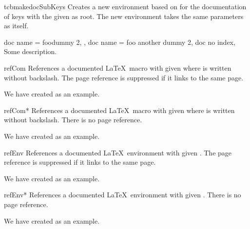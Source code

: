 \begin{docCommand}[doc new=2020-04-22]{tcbmakedocSubKeys}{}
  Creates a new environment  based on  for the
  documentation of keys with the given  as root.
  The new environment  takes the same para\-meters as  itself.
\begin{dispExample}

\begin{docFooKeys}[
    doc parameter   = {=\meta{nothing}},
    doc description = {no default, initially empty},
  ]
  {
    {
      doc name = foodummy 2,
    },
    {
      doc name = foo another dummy 2,
      doc no index,
    }
  }
Some description.
\end{docFooKeys}
\end{dispExample}
\end{docCommand}


\clearpage

\begin{docCommand}{refCom}{}
  References a documented \LaTeX\ macro with given  where  is
  written without backslash. The page reference is suppressed if it links
  to the same page.
\begin{dispExample}
We have created  as an example.
\end{dispExample}
\end{docCommand}

\begin{docCommand}{refCom*}{}
  References a documented \LaTeX\ macro with given  where  is
  written without backslash. There is no page reference.
\begin{dispExample}
We have created  as an example.
\end{dispExample}
\end{docCommand}


\begin{docCommand}{refEnv}{}
  References a documented \LaTeX\ environment with given .
  The page reference is suppressed if it links to the same page.
\begin{dispExample}
We have created  as an example.
\end{dispExample}
\end{docCommand}

\begin{docCommand}{refEnv*}{}
  References a documented \LaTeX\ environment with given .
  There is no page reference.
\begin{dispExample}
We have created  as an example.
\end{dispExample}
\end{docCommand}


